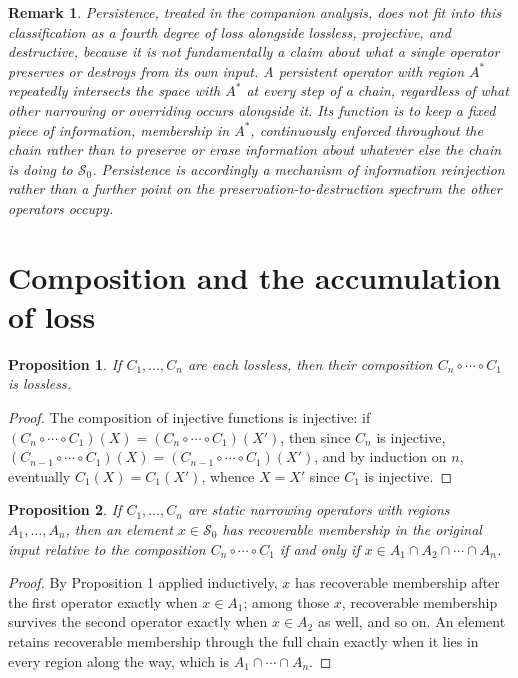\documentclass[11pt]{article}
\newtheorem{proposition}{Proposition}
\newtheorem{remark}{Remark}
\begin{document}
\begin{remark}
Persistence, treated in the companion analysis, does not fit into this classification as a fourth degree of loss alongside lossless, projective, and destructive, because it is not fundamentally a claim about what a single operator preserves or destroys from its own input. A persistent operator with region $A^{\ast}$ repeatedly intersects the space with $A^{\ast}$ at every step of a chain, regardless of what other narrowing or overriding occurs alongside it. Its function is to keep a fixed piece of information, membership in $A^{\ast}$, continuously enforced throughout the chain rather than to preserve or erase information about whatever else the chain is doing to $\mathcal{S}_0$. Persistence is accordingly a mechanism of information reinjection rather than a further point on the preservation-to-destruction spectrum the other operators occupy.
\end{remark}

\section{Composition and the accumulation of loss}

\begin{proposition}
If $C_1, \ldots, C_n$ are each lossless, then their composition $C_n \circ \cdots \circ C_1$ is lossless.
\end{proposition}

\begin{proof}
The composition of injective functions is injective: if $(C_n \circ \cdots \circ C_1)(X) = (C_n \circ \cdots \circ C_1)(X')$, then since $C_n$ is injective, $(C_{n-1} \circ \cdots \circ C_1)(X) = (C_{n-1} \circ \cdots \circ C_1)(X')$, and by induction on $n$, eventually $C_1(X) = C_1(X')$, whence $X = X'$ since $C_1$ is injective.
\end{proof}

\begin{proposition}
If $C_1, \ldots, C_n$ are static narrowing operators with regions $A_1, \ldots, A_n$, then an element $x \in \mathcal{S}_0$ has recoverable membership in the original input relative to the composition $C_n \circ \cdots \circ C_1$ if and only if $x \in A_1 \cap A_2 \cap \cdots \cap A_n$.
\end{proposition}

\begin{proof}
By Proposition 1 applied inductively, $x$ has recoverable membership after the first operator exactly when $x \in A_1$; among those $x$, recoverable membership survives the second operator exactly when $x \in A_2$ as well, and so on. An element retains recoverable membership through the full chain exactly when it lies in every region along the way, which is $A_1 \cap \cdots \cap A_n$.
\end{proof}
\end{document}
